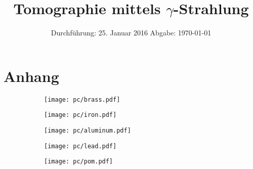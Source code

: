 

\subject{Fortgeschrittenen Praktikum V14}
\title{Tomographie mittels \texorpdfstring{$\gamma$}{Gamma}-Strahlung}
\date{
  Durchführung: 25. Januar 2016
  \hspace{3em}
  Abgabe: \today
}



\maketitle
\thispagestyle{empty}
\tableofcontents
\newpage






\printbibliography

\newpage
\section{Anhang}
\begin{figure}[p]
  \centering
\begin{subfigure}{0.7\textwidth}
  \centering
  \texttt{[image: pc/brass.pdf]}
\end{subfigure}
\begin{subfigure}{0.7\textwidth}
  \centering
  \texttt{[image: pc/iron.pdf]}
\end{subfigure}
\begin{subfigure}{0.7\textwidth}
  \centering
  \texttt{[image: pc/aluminum.pdf]}
\end{subfigure}
\end{figure}
\begin{figure}[p]
  \centering
\begin{subfigure}{0.7\textwidth}
  \centering
  \texttt{[image: pc/lead.pdf]}
\end{subfigure}
\centering
\begin{subfigure}{0.7\textwidth}
  \centering
  \texttt{[image: pc/pom.pdf]}
\end{subfigure}
\end{figure}


